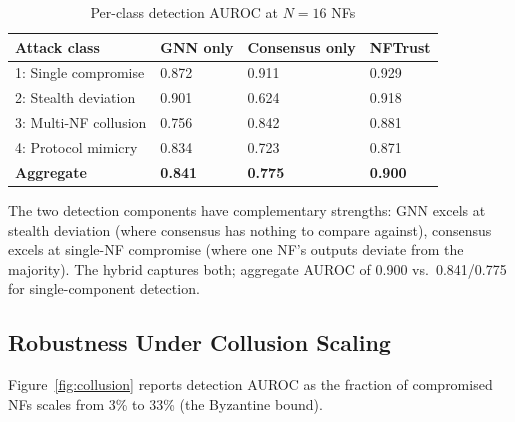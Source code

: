 \documentclass[sigconf,nonacm]{acmart}
\begin{document}
\begin{table}[h]
\caption{Per-class detection AUROC at $N=16$ NFs}
\label{tab:perclass}
\small
\begin{tabularx}{\columnwidth}{@{}p{2.6cm}X X X@{}}
\toprule
\textbf{Attack class} & \textbf{GNN only} & \textbf{Consensus only} & \textbf{NFTrust} \\
\midrule
1: Single compromise   & 0.872 & 0.911 & 0.929 \\
2: Stealth deviation   & 0.901 & 0.624 & 0.918 \\
3: Multi-NF collusion  & 0.756 & 0.842 & 0.881 \\
4: Protocol mimicry    & 0.834 & 0.723 & 0.871 \\
\midrule
\textbf{Aggregate}     & \textbf{0.841} & \textbf{0.775} & \textbf{0.900} \\
\bottomrule
\end{tabularx}
\end{table}

The two detection components have complementary strengths: GNN
excels at stealth deviation (where consensus has nothing to
compare against), consensus excels at single-NF compromise
(where one NF's outputs deviate from the majority). The hybrid
captures both; aggregate AUROC of 0.900 vs.\ 0.841/0.775 for
single-component detection.

\subsection{Robustness Under Collusion Scaling}

Figure~\ref{fig:collusion} reports detection AUROC as the
fraction of compromised NFs scales from 3\% to 33\% (the
Byzantine bound).
\end{document}
